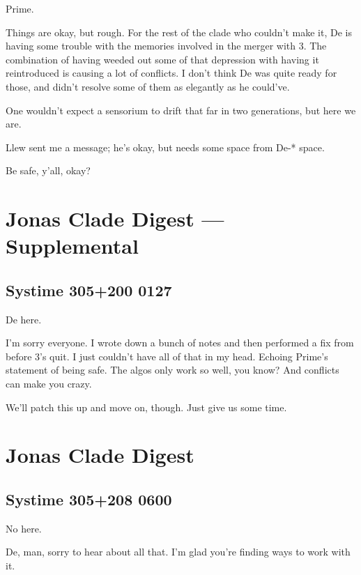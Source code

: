 Prime.

Things are okay, but rough. For the rest of the clade who couldn't make it, De is having some trouble with the memories involved in the merger with 3. The combination of having weeded out some of that depression with having it reintroduced is causing a lot of conflicts. I don't think De was quite ready for those, and didn't resolve some of them as elegantly as he could've.

One wouldn't expect a sensorium to drift that far in two generations, but here we are.

Llew sent me a message; he's okay, but needs some space from De-* space.

Be safe, y'all, okay?

\newpage
\hypertarget{jonas-clade-digest-supplemental-8}{%
\section*{Jonas Clade Digest --- Supplemental}\label{jonas-clade-digest-supplemental-8}}

\hypertarget{systime-305200-0127}{%
\subsection*{Systime 305+200 0127}\label{systime-305200-0127}}

De here.

I'm sorry everyone. I wrote down a bunch of notes and then performed a fix from before 3's quit. I just couldn't have all of that in my head. Echoing Prime's statement of being safe. The algos only work so well, you know? And conflicts can make you crazy.

We'll patch this up and move on, though. Just give us some time.

\newpage
\hypertarget{jonas-clade-digest-4}{%
\section*{Jonas Clade Digest}\label{jonas-clade-digest-4}}

\hypertarget{systime-305208-0600}{%
\subsection*{Systime 305+208 0600}\label{systime-305208-0600}}

No here.

De, man, sorry to hear about all that. I'm glad you're finding ways to work with it.

